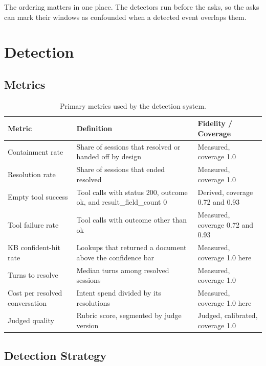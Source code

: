 \documentclass[8pt,twocolumn,a4paper]{extarticle}
\begin{document}
The ordering matters in one place. The detectors run before the asks, so
the asks can mark their windows as confounded when a detected event
overlaps them.


\section{Detection}

\subsection{Metrics}

\begin{table}[t]
\centering
\caption{Primary metrics used by the detection system.}
\label{tab:metrics}
\small
\begin{tabular}{p{}p{}p{}}
\toprule
\textbf{Metric} & \textbf{Definition} & \textbf{Fidelity / Coverage} \\
\midrule
Containment rate & Share of sessions that resolved or handed off by design & Measured, coverage 1.0 \\
Resolution rate & Share of sessions that ended resolved & Measured, coverage 1.0 \\
Empty tool success & Tool calls with status 200, outcome ok, and result\_field\_count 0 & Derived, coverage 0.72 and 0.93 \\
Tool failure rate & Tool calls with outcome other than ok & Measured, coverage 0.72 and 0.93 \\
KB confident-hit rate & Lookups that returned a document above the confidence bar & Measured, coverage 1.0 here \\
Turns to resolve & Median turns among resolved sessions & Measured, coverage 1.0 \\
Cost per resolved conversation & Intent spend divided by its resolutions & Measured, coverage 1.0 here \\
Judged quality & Rubric score, segmented by judge version & Judged, calibrated, coverage 1.0 \\
\bottomrule
\end{tabular}
\end{table}

\subsection{Detection Strategy}
\end{document}
